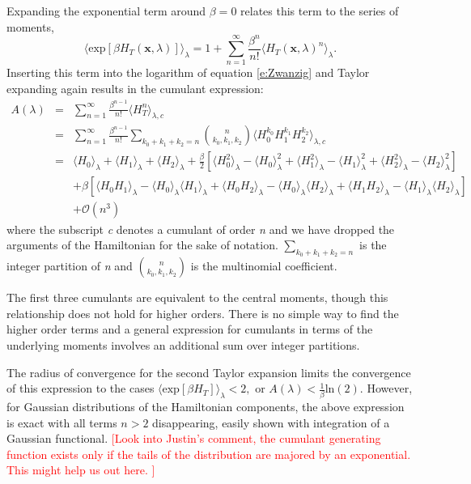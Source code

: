 \documentclass[%
 preprint,
 amsmath,amssymb,
 aps,
]{revtex4-1}
\newcommand{\warning}[1]{{\textsf{{\textcolor{red}{{[#1]}{}}}}}}
\renewcommand{\vec}[1]{{\bm{#1}}}
\begin{document}
Expanding the exponential term around $\beta=0$ relates this term to the series of moments,
\begin{equation}
 \langle \mbox{exp} \left[ \beta H_T (\vec{x},\lambda) \right]  \rangle_{\lambda} = 
 1+\sum_{n=1}^{\infty}  \frac{\beta^n}{n!} \langle  H_T (\vec{x},\lambda)^n \rangle_{\lambda}.
\label{e:Taylor1}
\end{equation}
Inserting this term into the logarithm of equation \ref{e:Zwanzig} and Taylor expanding again results in the cumulant 
expression:
\begin{eqnarray}
A (\lambda) &=& \sum_{n=1}^{\infty}  \frac{\beta^{n-1}}{n!} \langle  H_T^n \rangle_{\lambda,c} \\
& = &
\sum_{n=1}^{\infty}  \frac{\beta^{n-1}}{n!}  \sum_{k_0+k_1+k_2=n} 
{ n \choose k_0,k_1,k_2 } \langle  H_0^{k_0} H_1^{k_1} H_2^{k_2} \rangle_{\lambda,c} \\
& = &
\langle  H_0 \rangle_{\lambda}  + \langle  H_1 \rangle_{\lambda} + \langle  H_2 \rangle_{\lambda}  
+ \frac{\beta}{2} \left[  \langle  H_0^2 \rangle_{\lambda} -\langle  H_0 \rangle^2_{\lambda}  +
\langle  H_1^2 \rangle_{\lambda} -\langle  H_1 \rangle^2_{\lambda}  
 + \langle  H_2^2 \rangle_{\lambda} -\langle  H_2 \rangle^2_{\lambda}   \right] 
\\ 
 & & 
 + \beta \left[ \langle  H_0 H_1\rangle_{\lambda} -\langle  H_0 \rangle_{\lambda} \langle  H_1 \rangle_{\lambda} 
 +\langle  H_0 H_2\rangle_{\lambda} -\langle  H_0 \rangle_{\lambda} \langle  H_2 \rangle_{\lambda} 
 +\langle  H_1 H_2\rangle_{\lambda} -\langle  H_1 \rangle_{\lambda} \langle  H_2 \rangle_{\lambda} 
   \right]
  \\ & & 
 + \mathcal{O} (n^3)
\label{e:CumulantTot}
\end{eqnarray}
where the subscript \emph{c} denotes a cumulant of order \emph{n} and we have dropped the arguments of the Hamiltonian for the sake of notation.  $ \sum_{k_0+k_1+k_2=n} $ is the integer partition of \emph{n} and 
${ n \choose k_0,k_1,k_2 }$ is the multinomial coefficient.

The first three cumulants are equivalent to the central moments, though this relationship does not hold for higher orders.  There is no simple way to find the higher order terms and a general expression for cumulants in terms of the underlying moments involves an additional sum over integer partitions.\cite{NULL}

The radius of convergence for the second Taylor expansion limits the convergence of this expression to the cases  
$
\langle \mbox{exp} \left[ \beta H_T  \right]  \rangle_{\lambda} < 2,
$
or 
$
A (\lambda) < \frac{1}{\beta}\mbox{ln} (2)
$.  However, for Gaussian distributions of the Hamiltonian components, the above expression is exact with all terms $n>2$ disappearing, easily shown with integration of a Gaussian functional. 
\warning{Look into Justin's comment, the cumulant generating function exists only if the tails of the distribution are majored by an exponential.  This might help us out here. }
\end{document}
